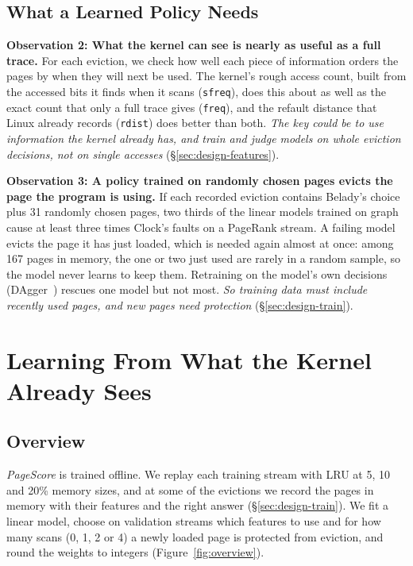 \documentclass{article}
\newcommand{\clock}{Clock\xspace}
\newcommand{\belady}{Belady\xspace}
\DeclareRobustCommand{\pagescore}{\textit{PageScore}}
\newcommand{\feat}[1]{\texttt{#1}}
\newcommand{\obs}[2]{\textbf{Observation #1: #2}\hspace{0.4em}}
\begin{document}
\subsection{What a Learned Policy Needs}
\label{sec:bg-signals}\label{sec:bg-naive}

\obs{2}{What the kernel can see is nearly as useful as a full trace.} For each eviction, we check how well each piece of information orders the pages by when they will next be used. The kernel's rough access count, built from the accessed bits it finds when it scans (\feat{sfreq}), does this about as well as the exact count that only a full trace gives (\feat{freq}), and the refault distance that Linux already records (\feat{rdist}) does better than both. \emph{The key could be to use information the kernel already has, and train and judge models on whole eviction decisions, not on single accesses} (\S\ref{sec:design-features}).

\obs{3}{A policy trained on randomly chosen pages evicts the page the program is using.} If each recorded eviction contains \belady's choice plus 31 randomly chosen pages, two thirds of the linear models trained on graph cause at least three times \clock's faults on a PageRank stream. A failing model evicts the page it has just loaded, which is needed again almost at once: among 167 pages in memory, the one or two just used are rarely in a random sample, so the model never learns to keep them. Retraining on the model's own decisions (DAgger~\citep{ross2011dagger}) rescues one model but not most. \emph{So training data must include recently used pages, and new pages need protection} (\S\ref{sec:design-train}).

\section{Learning From What the Kernel Already Sees}
\label{sec:design}

\subsection{Overview}
\label{sec:design-overview}

\pagescore{} is trained offline. We replay each training stream with LRU at 5, 10 and 20\% memory sizes, and at some of the evictions we record the pages in memory with their features and the right answer (\S\ref{sec:design-train}). We fit a linear model, choose on validation streams which features to use and for how many scans (0, 1, 2 or 4) a newly loaded page is protected from eviction, and round the weights to integers (Figure~\ref{fig:overview}).
\end{document}
